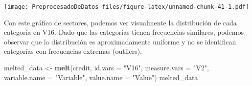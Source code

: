 \documentclass[
]{article}
\newenvironment{Shaded}{\begin{snugshade}}{\end{snugshade}}
\newcommand{\AttributeTok}[1]{\textcolor[rgb]{0.13,0.29,0.53}{#1}}
\newcommand{\FunctionTok}[1]{\textcolor[rgb]{0.13,0.29,0.53}{\textbf{#1}}}
\newcommand{\NormalTok}[1]{#1}
\newcommand{\OtherTok}[1]{\textcolor[rgb]{0.56,0.35,0.01}{#1}}
\newcommand{\StringTok}[1]{\textcolor[rgb]{0.31,0.60,0.02}{#1}}
\begin{document}
\texttt{[image: PreprocesadoDeDatos\_files/figure-latex/unnamed-chunk-41-1.pdf]}

Con este gráfico de sectores, podemos ver visualmente la distribución de
cada categoría en V16. Dado que las categorías tienen frecuencias
similares, podemos observar que la distribución es aproximadamente
uniforme y no se identifican categorías con frecuencias extremas
(outliers).

\begin{Shaded}
\begin{Highlighting}[]
\NormalTok{melted\_data }\OtherTok{\textless{}{-}} \FunctionTok{melt}\NormalTok{(credit, }\AttributeTok{id.vars =} \StringTok{"V16"}\NormalTok{, }\AttributeTok{measure.vars =} \StringTok{"V2"}\NormalTok{, }\AttributeTok{variable.name =} \StringTok{"Variable"}\NormalTok{, }\AttributeTok{value.name =} \StringTok{"Value"}\NormalTok{)}
\NormalTok{melted\_data}
\end{Highlighting}
\end{Shaded}
\end{document}
